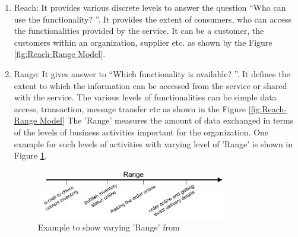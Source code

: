 \begin{enumerate}
\item Reach: It provides various discrete levels to answer the question “Who can use the functionality? ”.  It provides the extent of consumers, who can access the functionalities provided by the service. It can be a customer, the customers within an organization, supplier etc. as shown by the Figure \ref{fig:Reach-Range Model}.
\\
\item Range: It gives answer to “Which functionality is available? ”. It defines the extent to which the information can be accessed from the service or shared with the service. The various levels of functionalities can be simple data access, transaction, message transfer etc as shown in the Figure \ref{fig:Reach-Range Model} The 'Range' measures the amount of data exchanged in terms of the levels of business activities important for the organization. One example for such levels of activities with varying level of 'Range' is shown in Figure \ref{fig:Range Example}.

\begin{figure}[H]
\begin{center}
\includegraphics[width=0.8\textwidth]{figures/Granularity-R3-two}
\caption{Example to show varying 'Range' from \cite{Keen:2015aa, Weill:1998aa}}
\label{fig:Range Example}
\end{center}
\end{figure}


\end{enumerate}
